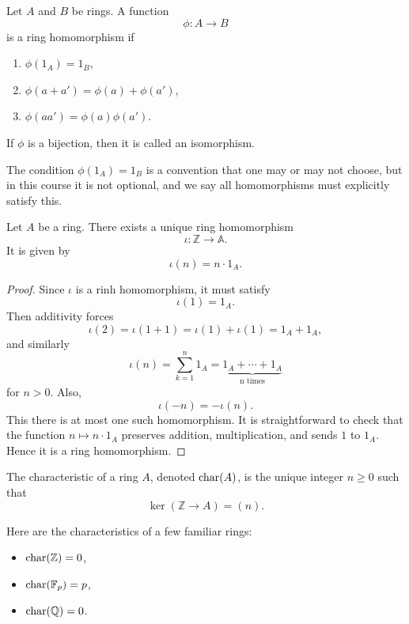 \begin{defn}
    Let $A$ and $B$ be rings. A function 
    \[
        \phi : A \to B
    \]
    is a ring homomorphism if 
    \begin{enumerate}
        \item $\phi(1_A) = 1_B$, 
        \item $\phi(a + a') = \phi(a) + \phi(a')$, 
        \item $\phi(aa') = \phi(a) \phi(a')$. 
    \end{enumerate}
    If $\phi$ is a bijection, then it is 
    called an isomorphism. 
\end{defn}
The condition $\phi(1_A) = 1_B$ is a convention that 
one may or may not choose, but in this course it is 
not optional, and we say all homomorphisms must explicitly 
satisfy this. 

\begin{prop}
    Let $A$ be a ring. There exists a unique ring homomorphism 
    \[
        \iota : \mathbb Z \to \mathbb A.
    \]
    It is given by 
    \[
        \iota(n) = n \cdot 1_A.
    \]
\end{prop}
\begin{proof}
    Since $\iota$ is a rinh homomorphism, it must satisfy 
    \[
        \iota(1) = 1_A. 
    \]
    Then additivity forces 
    \[
        \iota(2) = \iota(1+1) = \iota(1) + \iota(1) 
        = 1_A + 1_A, 
    \]
    and similarly 
    \[
        \iota(n) = \sum_{k=1}^n 1_A = 
        \underbrace{1_A + \cdots + 1_A}_{\text{n times}} 
    \]
    for $n > 0$. Also, 
    \[
        \iota(-n) = -\iota(n).
    \]
    This there is at most one such homomorphism. 
    It is straightforward to check that the function 
    $n \mapsto n \cdot 1_A$ preserves addition, multiplication, 
    and sends $1$ to $1_A$. Hence it is a ring homomorphism. 
\end{proof}

\begin{defn}[Characteristic]
    The characteristic of a ring $A$, denoted $\operatorname{char}(A)$,
    is the unique integer $n \geq 0$ such that 
    \[
        \ker(\mathbb Z \to A) = (n). 
    \]
\end{defn}
\begin{ex}
    Here are the characteristics of a few familiar 
    rings: 
    \begin{itemize}
        \item $\operatorname{char}(\mathbb Z) = 0$,  
        \item $\operatorname{char}(\mathbb F_p) = p$, 
        \item $\operatorname{char}(\mathbb Q) = 0$. 
    \end{itemize}
\end{ex}

